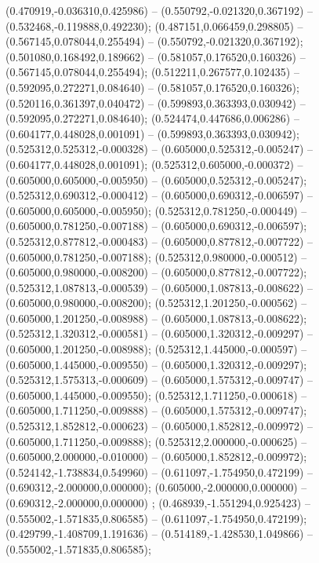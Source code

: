  (0.470919,-0.036310,0.425986) -- (0.550792,-0.021320,0.367192) -- (0.532468,-0.119888,0.492230);
 (0.487151,0.066459,0.298805) -- (0.567145,0.078044,0.255494) -- (0.550792,-0.021320,0.367192);
 (0.501080,0.168492,0.189662) -- (0.581057,0.176520,0.160326) -- (0.567145,0.078044,0.255494);
 (0.512211,0.267577,0.102435) -- (0.592095,0.272271,0.084640) -- (0.581057,0.176520,0.160326);
 (0.520116,0.361397,0.040472) -- (0.599893,0.363393,0.030942) -- (0.592095,0.272271,0.084640);
 (0.524474,0.447686,0.006286) -- (0.604177,0.448028,0.001091) -- (0.599893,0.363393,0.030942);
 (0.525312,0.525312,-0.000328) -- (0.605000,0.525312,-0.005247) -- (0.604177,0.448028,0.001091);
 (0.525312,0.605000,-0.000372) -- (0.605000,0.605000,-0.005950) -- (0.605000,0.525312,-0.005247);
 (0.525312,0.690312,-0.000412) -- (0.605000,0.690312,-0.006597) -- (0.605000,0.605000,-0.005950);
 (0.525312,0.781250,-0.000449) -- (0.605000,0.781250,-0.007188) -- (0.605000,0.690312,-0.006597);
 (0.525312,0.877812,-0.000483) -- (0.605000,0.877812,-0.007722) -- (0.605000,0.781250,-0.007188);
 (0.525312,0.980000,-0.000512) -- (0.605000,0.980000,-0.008200) -- (0.605000,0.877812,-0.007722);
 (0.525312,1.087813,-0.000539) -- (0.605000,1.087813,-0.008622) -- (0.605000,0.980000,-0.008200);
 (0.525312,1.201250,-0.000562) -- (0.605000,1.201250,-0.008988) -- (0.605000,1.087813,-0.008622);
 (0.525312,1.320312,-0.000581) -- (0.605000,1.320312,-0.009297) -- (0.605000,1.201250,-0.008988);
 (0.525312,1.445000,-0.000597) -- (0.605000,1.445000,-0.009550) -- (0.605000,1.320312,-0.009297);
 (0.525312,1.575313,-0.000609) -- (0.605000,1.575312,-0.009747) -- (0.605000,1.445000,-0.009550);
 (0.525312,1.711250,-0.000618) -- (0.605000,1.711250,-0.009888) -- (0.605000,1.575312,-0.009747);
 (0.525312,1.852812,-0.000623) -- (0.605000,1.852812,-0.009972) -- (0.605000,1.711250,-0.009888);
 (0.525312,2.000000,-0.000625) -- (0.605000,2.000000,-0.010000) -- (0.605000,1.852812,-0.009972);
 (0.524142,-1.738834,0.549960) -- (0.611097,-1.754950,0.472199) -- (0.690312,-2.000000,0.000000);
 (0.605000,-2.000000,0.000000) -- (0.690312,-2.000000,0.000000) ;
 (0.468939,-1.551294,0.925423) -- (0.555002,-1.571835,0.806585) -- (0.611097,-1.754950,0.472199);
 (0.429799,-1.408709,1.191636) -- (0.514189,-1.428530,1.049866) -- (0.555002,-1.571835,0.806585);
